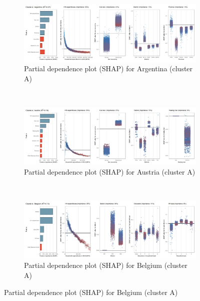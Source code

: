 \begin{figure}[ht!]
     \centering
    \caption{Partial dependence plot (SHAP) for 87 countries and nine clusters}
    \label{fig:5b}
     \begin{subfigure}[b]{\textwidth}
         \centering
         \caption{Partial dependence plot (SHAP) for Argentina (cluster A)}
         \label{fig:5b_ARG}
         \includegraphics[width=\textwidth]{Figure 5b/Figure_5b_ARG} 
     \end{subfigure}
    \\
    \vspace{0.5cm}
     \begin{subfigure}[b]{\textwidth}
         \centering
         \caption{Partial dependence plot (SHAP) for Austria (cluster A)}
         \label{fig:5b_AUT}
         \includegraphics[width=\textwidth]{Figure 5b/Figure_5b_AUT}    \end{subfigure}
    \\
    \vspace{0.5cm}
     \begin{subfigure}[b]{1\textwidth}
     \centering
         \caption{Partial dependence plot (SHAP) for Belgium (cluster A)}
         \label{fig:5b_BEL}
         \includegraphics[width=\textwidth]{Figure 5b/Figure_5b_BEL} 

\end{subfigure}
\end{figure}
